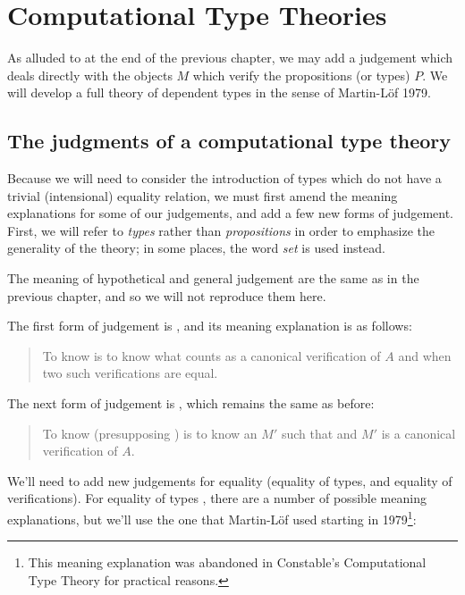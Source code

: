\documentclass[main.tex]{subfiles}
\begin{document}
\onehalfspacing

\chapter{Computational Type Theories}

As alluded to at the end of the previous chapter, we may add a judgement
 which deals directly with the objects $M$ which verify the
propositions (or types) $P$. We will develop a full theory of dependent types in
the sense of Martin-L\"of 1979.

\section{The judgments of a computational type theory}

Because we will need to consider the introduction of types which do not have a
trivial (intensional) equality relation, we must first amend the meaning
explanations for some of our judgements, and add a few new forms of judgement.
First, we will refer to \emph{types} rather than \emph{propositions} in order
to emphasize the generality of the theory; in some places, the word \emph{set}
is used instead.

The meaning of hypothetical and general judgement are the same as in the
previous chapter, and so we will not reproduce them here.

The first form of judgement is , and its meaning explanation
is as follows:

\begin{quote}
  To know  is to know what counts as a canonical verification of $A$
  and when two such verifications are equal.
\end{quote}

The next form of judgement is , which remains the same as before:

\begin{quote}
  To know  (presupposing ) is to know an $M'$ such that
   and $M'$ is a canonical verification of $A$.
\end{quote}

We'll need to add new judgements for equality (equality of types, and equality
of verifications). For equality of types , there are a
number of possible meaning explanations, but we'll use the one that
Martin-L\"of used starting in 1979\footnote{This meaning explanation was
abandoned in Constable's Computational Type Theory for practical reasons.}:
\end{document}
